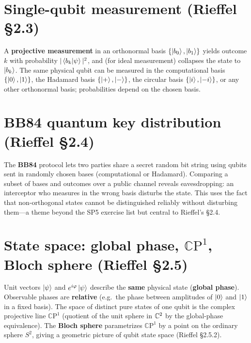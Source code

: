 \section{Single-qubit measurement (Rieffel \S2.3)}

A \textbf{projective measurement} in an orthonormal basis $\{\left|b_0\right\rangle,\left|b_1\right\rangle\}$ yields outcome $k$ with probability $|\left\langle b_k\middle|\psi\right\rangle|^2$, and (for ideal measurement) collapses the state to $\left|b_k\right\rangle$. The same physical qubit can be measured in the computational basis $\{\left|0\right\rangle,\left|1\right\rangle\}$, the Hadamard basis $\{\left|+\right\rangle,\left|-\right\rangle\}$, the circular basis $\{\left|i\right\rangle,\left|-i\right\rangle\}$, or any other orthonormal basis; probabilities depend on the chosen basis.

\section{BB84 quantum key distribution (Rieffel \S2.4)}

The \textbf{BB84} protocol lets two parties share a secret random bit string using qubits sent in randomly chosen bases (computational or Hadamard). Comparing a subset of bases and outcomes over a public channel reveals eavesdropping: an interceptor who measures in the wrong basis disturbs the state. This uses the fact that non-orthogonal states cannot be distinguished reliably without disturbing them---a theme beyond the SP5 exercise list but central to Rieffel's \S2.4.

\section{State space: global phase, $\mathbb{C}\mathrm{P}^1$, Bloch sphere (Rieffel \S2.5)}

Unit vectors $\left|\psi\right\rangle$ and $e^{i\varphi}\left|\psi\right\rangle$ describe the \textbf{same} physical state (\textbf{global phase}). Observable phases are \textbf{relative} (e.g.\ the phase between amplitudes of $\left|0\right\rangle$ and $\left|1\right\rangle$ in a fixed basis). The space of distinct pure states of one qubit is the complex projective line $\mathbb{C}\mathrm{P}^1$ (quotient of the unit sphere in $\mathbb{C}^2$ by the global-phase equivalence). The \textbf{Bloch sphere} parametrizes $\mathbb{C}\mathrm{P}^1$ by a point on the ordinary sphere $S^2$, giving a geometric picture of qubit state space (Rieffel \S2.5.2).

